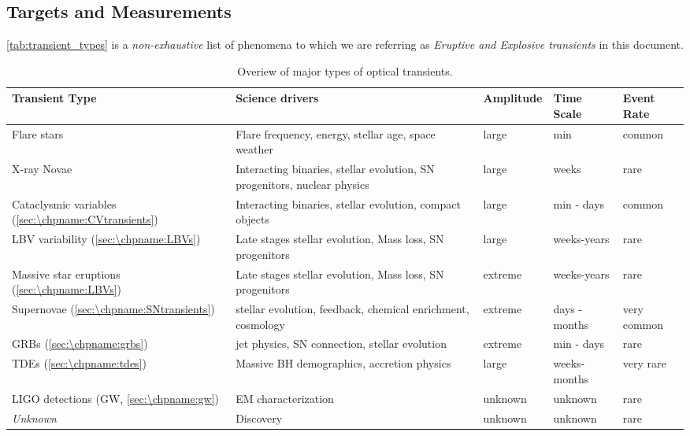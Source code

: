 \subsection{Targets and Measurements}
\label{sec:\chpname:targets}

\autoref{tab:transient_types} is a \emph{non-exhaustive} list of
phenomena to which we are referring as \emph{Eruptive and Explosive
  transients} in this document.

  \begin{table}
\begin{center}
  \begin{tabular}{| p{4.0cm} | p{4.0cm} | l | l | p{1.5cm}|}
    \hline

    Transient Type & Science drivers & Amplitude & Time Scale & Event Rate\\
\hline

Flare stars & Flare frequency, energy, stellar age, space weather & large & min & common\\

X-ray Novae & Interacting binaries, stellar evolution, SN progenitors,
nuclear physics & large & weeks & rare\\

Cataclysmic variables (\ref{sec:\chpname:CVtransients})& Interacting binaries, stellar evolution, compact
objects & large & min - days & common\\

LBV variability (\ref{sec:\chpname:LBVs})& Late stages stellar evolution, Mass loss, SN progenitors
& large & weeks-years & rare \\

Massive star eruptions (\ref{sec:\chpname:LBVs})& Late stages stellar evolution, Mass loss, SN progenitors & extreme & weeks-years & rare\\

Supernovae (\ref{sec:\chpname:SNtransients})& stellar evolution, feedback, chemical enrichment, cosmology & extreme & days - months & very common\\

GRBs (\ref{sec:\chpname:grbs})& jet physics, SN connection, stellar evolution & extreme & min - days
& rare\\

TDEs (\ref{sec:\chpname:tdes})& Massive BH demographics, accretion physics & large & weeks-months & very rare\\


LIGO detections (GW, \ref{sec:\chpname:gw}) & EM characterization & unknown & unknown & rare\\

\emph{Unknown} & Discovery & unknown & unknown & rare\\

 \hline \end{tabular}
\end{center}
\caption{Overiew of major types of optical transients.
\label{tab:transient_types}}
\end{table}

